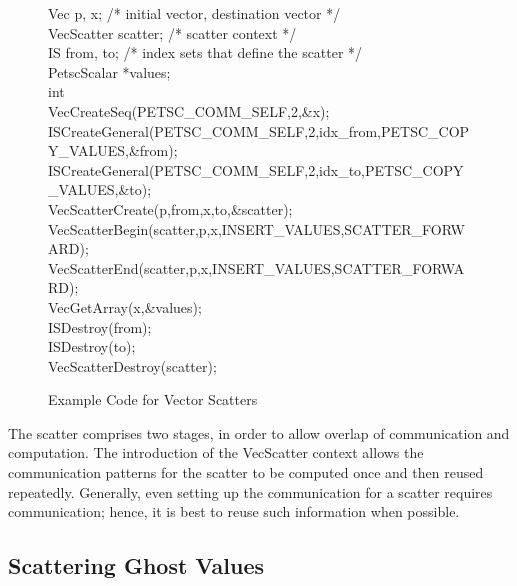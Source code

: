 \begin{figure}[tb]
\begin{tabbing}
   Vec         p, x;         /* initial vector, destination vector */\\
   VecScatter  scatter;      /* scatter context */\\
   IS          from, to;     /* index sets that define the scatter */\\
   PetscScalar *values;\\
   int         \\

   VecCreateSeq(PETSC_COMM_SELF,2,\&x);\\
   ISCreateGeneral(PETSC_COMM_SELF,2,idx\_from,PETSC\_COPY\_VALUES,\&from);\\
   ISCreateGeneral(PETSC_COMM_SELF,2,idx\_to,PETSC\_COPY\_VALUES,\&to);\\
   VecScatterCreate(p,from,x,to,\&scatter);\\
   VecScatterBegin(scatter,p,x,INSERT_VALUES,SCATTER_FORWARD);\\
   VecScatterEnd(scatter,p,x,INSERT_VALUES,SCATTER_FORWARD);\\
   VecGetArray(x,\&values);\\
   ISDestroy(from);\\
   ISDestroy(to); \\
   VecScatterDestroy(scatter);
\end{tabbing}
\caption{Example Code for Vector Scatters}
\label{fig_vecscatter}
\end{figure}

The scatter comprises two stages, in order to allow overlap of 
communication and computation. The introduction of the 
VecScatter context allows the communication patterns for the scatter
to be computed once and then reused repeatedly. Generally, even 
setting up the communication for a scatter requires communication; 
hence, it is best to reuse such information when possible.

\subsection{Scattering Ghost Values}

